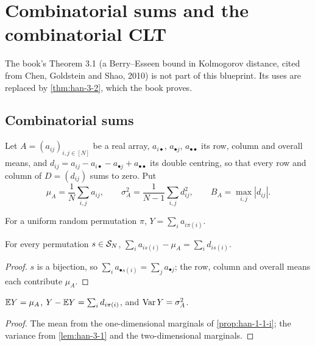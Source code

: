 \chapter{Combinatorial sums and the combinatorial CLT}
\label{chap:combinatorial-clt}

The book's Theorem 3.1 (a Berry--Esseen bound in Kolmogorov distance, cited from Chen, Goldstein and Shao, 2010) is not part of this blueprint. Its uses are replaced by \cref{thm:han-3-2}, which the book proves.

\section{Combinatorial sums}

\begin{definition}
  \label{def:array}
  Let $A=(a_{ij})_{i,j\in[N]}$ be a real array, $a_{i\bullet}$, $a_{\bullet j}$, $a_{\bullet\bullet}$ its row, column and overall means, and $d_{ij}=a_{ij}-a_{i\bullet}-a_{\bullet j}+a_{\bullet\bullet}$ its double centring, so that every row and column of $D=(d_{ij})$ sums to zero. Put
  \[
    \mu_A=\frac1N\sum_{i,j}a_{ij},\qquad\sigma_A^2=\frac1{N-1}\sum_{i,j}d_{ij}^2,\qquad B_A=\max_{i,j}|d_{ij}|.
  \]
\end{definition}

\begin{definition}
  \label{def:combinatorial-sum}
  For a uniform random permutation $\pi$, $Y=\sum_{i}a_{i\pi(i)}$.
\end{definition}

\begin{lemma}
  \label{lem:han-3-1}
  For every permutation $s\in\mathcal{S}_N$, $\sum_ia_{is(i)}-\mu_A=\sum_id_{is(i)}$.
\end{lemma}
\begin{proof}
  $s$ is a bijection, so $\sum_ia_{\bullet s(i)}=\sum_ja_{\bullet j}$; the row, column and overall means each contribute $\mu_A$.
\end{proof}

\begin{proposition}
  \label{prop:han-3-1}
  $\mathbb{E} Y=\mu_A$, $Y-\mathbb{E} Y=\sum_id_{i\pi(i)}$, and $\operatorname{Var} Y=\sigma_A^2$.
\end{proposition}
\begin{proof}
  The mean from the one-dimensional marginals of \cref{prop:han-1-1-i}; the variance from \cref{lem:han-3-1} and the two-dimensional marginals.
\end{proof}

